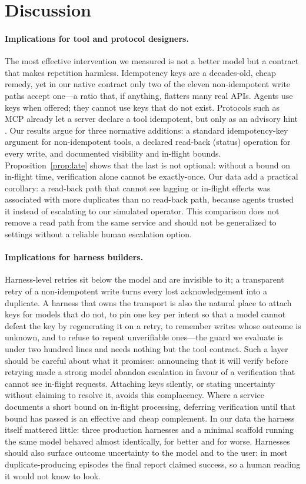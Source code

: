 \section{Discussion}
\label{sec:discussion}

\paragraph{Implications for tool and protocol designers.} The most effective intervention we measured is not a
better model but a contract that makes repetition harmless. Idempotency keys are a decades-old, cheap remedy,
yet in our native contract only two of the eleven non-idempotent write paths accept one---a ratio that, if
anything, flatters many real APIs. Agents use keys when offered; they cannot use keys that do not exist.
Protocols such as MCP already let a server declare a tool idempotent, but only as an advisory hint
\citep{mcp2025spec}. Our results argue for three normative additions: a standard idempotency-key argument for
non-idempotent tools, a declared read-back (status) operation for every write, and documented visibility and
in-flight bounds. Proposition~\ref{prop:late} shows that the last is not optional: without a bound on in-flight
time, verification alone cannot be exactly-once. Our data add a practical corollary: a read-back path that cannot
see lagging or in-flight effects was associated with more duplicates than no read-back path, because agents
trusted it instead of escalating to our simulated operator. This comparison does not remove a read path from
the same service and should not be generalized to settings without a reliable human escalation option.

\paragraph{Implications for harness builders.} Harness-level retries sit below the model and are invisible to
it; a transparent retry of a non-idempotent write turns every lost acknowledgement into a duplicate. A harness
that owns the transport is also the natural place to attach keys for models that do not, to pin one key per
intent so that a model cannot defeat the key by regenerating it on a retry, to remember writes whose outcome is
unknown, and to refuse to repeat unverifiable ones---the guard we evaluate is under two hundred lines and needs
nothing but the tool contract. Such a layer should be careful about what it promises: announcing that it
will verify before retrying made a strong model abandon escalation in favour of a verification that cannot see
in-flight requests. Attaching keys silently, or stating uncertainty without claiming to resolve it, avoids this
complacency. Where a service documents a short bound on in-flight processing, deferring verification until that
bound has passed is an effective and cheap complement. In our data the harness itself mattered little: three
production harnesses and a minimal scaffold running the same model behaved almost identically, for better and for
worse. Harnesses should also surface outcome uncertainty to the model and to the user: in most duplicate-producing
episodes the final report claimed success, so a human reading it would not know to look.


